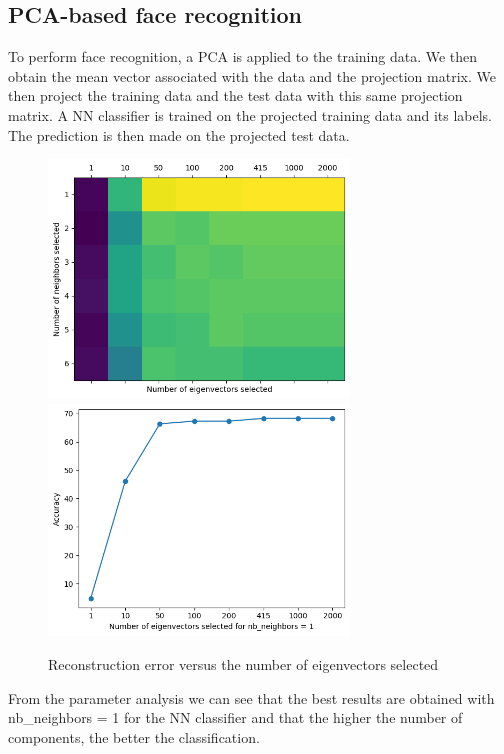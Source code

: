 \subsection{PCA-based face recognition}

To perform face recognition, a PCA is applied to the training data. We then obtain the mean vector associated with the data and the projection matrix. We then project the training data and the test data with this same projection matrix. A NN classifier is trained on the projected training data and its labels. The prediction is then made on the projected test data.

\begin{figure}[h]
	\centering
	\includegraphics[width=8.0cm]{./Ressources/matrix_neighbors_eigenvectors.png}
	\includegraphics[width=8.0cm]{./Ressources/accuracy_1neighbors.png}
	\vspace{-3mm}
	\caption{Reconstruction error versus the number of eigenvectors selected}
	\label{fig:rect_result}
\end{figure}

From the parameter analysis we can see that the best results are obtained with nb_neighbors = 1 for the NN classifier and that the higher the number of components, the better the classification.





